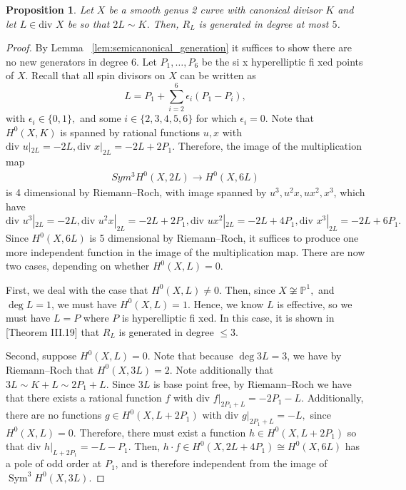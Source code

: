 \documentclass{amsart}
\theoremstyle{plain}
\newtheorem{prop}[thm]{Proposition}
\theoremstyle{definition}
\theoremstyle{remark}
\numberwithin{equation}{section}
\newcommand\BP{{\mathbb P}}
\newcommand \di{\text{div }}
\DeclareMathOperator{\sym}{Sym}
\begin{document}
\begin{prop}
\label{prop:genus_2_generation_5}
Let $X$ be a smooth genus 2 curve with canonical divisor $K$ and let $L \in \di X$ be so that $2L \sim K$. 
Then, $R_L$ is generated in degree at most $5$.
\end{prop}
\begin{proof}
By Lemma ~\ref{lem:semicanonical_generation} it suffices to show there are no new generators in degree 6.
Let $P_1, \ldots, P_6$ be the si x hyperelliptic fi xed points of $X$. 
Recall that all spin divisors on $X$ can be written as 
$$L = P_1 + \sum_{i =2}^{6} \epsilon_i (P_1 - P_i),$$ 
with $\epsilon_i \in \{0,1\},$ and some $i \in \{2, 3, 4, 5, 6\}$ for which $\epsilon_i = 0$. 
Note that $H^0(X,K)$ is spanned by rational functions $u, x$ with $\di u|_{2L} = -2L, \di x|_{2L} = -2L + 2P_1.$ Therefore, the image of the multiplication map 
\begin{align*}
	Sym^3 H^0(X,2L) \rightarrow H^0(X,6L)
\end{align*}
is 4 dimensional by Riemann--Roch, with image spanned by $u^3,u^2x,ux^2, x^3$, 
which have $\di u^3|_{2L} = -2L, \di u^2x|_{2L} = -2L + 2P_1,\di ux^2|_{2L} = -2L+4P_1, \di x^3|_{2L} = -2L + 6P_1.$ 
Since $H^0(X,6L)$ is 5 dimensional by Riemann--Roch,
it suffices to produce one more independent function in the image of the multiplication map.
There are now two cases, depending on whether $H^0(X,L) = 0$.

First, we deal with the case that $H^0(X,L) \neq 0$. 
Then, since $X \not \cong \BP^1,$ and $\deg L = 1$, we must have $H^0(X,L) = 1$. Hence, we know $L$ is effective, so we must have $L = P$ where $P$ is hyperelliptic fi xed. In this case, it is shown in \cite{neves:halfcan}[Theorem III.19] that $R_L$ is generated in degree $\leq 3$.

Second, suppose $H^0(X,L) = 0$.
Note that because $\deg 3L = 3$, we have by Riemann--Roch that $H^0(X,3L) = 2$. 
Note additionally that $3L \sim K + L \sim 2P_1 + L$. Since $3L$ is base point free, by Riemann--Roch
we have that there exists a rational function $f$ with $\di f|_{2P_1 + L} = -2P_1 - L.$ Additionally, there are no functions $g \in H^0(X,L + 2P_1)$ 
with $\di g|_{2P_1 + L} = -L,$ since $H^0(X,L) = 0.$ Therefore, there must 
exist a function $h \in H^0(X,L+2P_1)$ so that $\di h|_{L + 2P_1} = -L - P_1$.
Then, $h \cdot f \in H^0(X,2L + 4P_1) \cong H^0(X,6L)$ has a pole of odd 
order at $P_1$, and is therefore independent from the image of $\sym^3 H^0(X,3L)$.
\end{proof}
\end{document}
